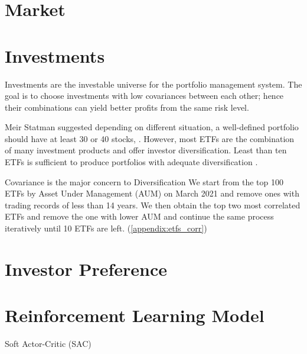 \section{Market}
\section{Investments}
Investments are the investable universe for the portfolio management system. The goal is to choose investments with low covariances between each other; hence their combinations can yield better profits from the same risk level\cite{willenbrock2011diversification}. 
\par 
Meir Statman suggested depending on different situation, a well-defined portfolio should have at least 30 or 40 stocks,  \cite{statman1987many}. However, most ETFs are the combination of many investment products and offer investor diversification. Least than ten ETFs is sufficient to produce portfolios with adequate diversification \cite{chang_2016}.
\par
Covariance is the major concern to Diversification 
We start from the top 100 ETFs by Asset Under Management (AUM) on March 2021 and remove ones with trading records of less than 14 years. We then obtain the top two most correlated ETFs and remove the one with lower AUM and continue the same process iteratively until 10 ETFs are left.  (\autoref{appendix:etfs_corr})
\par


\section{Investor Preference}
\section{Reinforcement Learning Model}
Soft Actor-Critic (SAC)\cite{haarnoja2018soft}